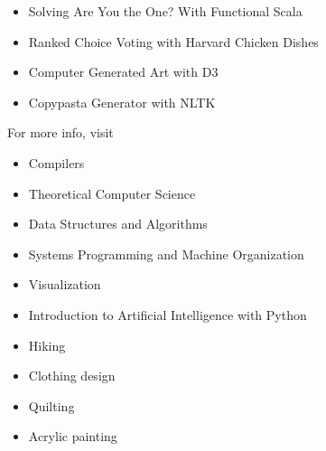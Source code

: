 







\medskip
{}

\medskip
{}
\begin{itemize}
\item Solving Are You the One? With Functional Scala
\item Ranked Choice Voting with Harvard Chicken Dishes
\item Computer Generated Art with D3
\item Copypasta Generator with NLTK
\end{itemize}
For more info, visit 

\medskip
{}
\begin{itemize}
\item Compilers
\item Theoretical Computer Science
\item Data Structures and Algorithms
\item Systems Programming and Machine Organization
\item Visualization
\item Introduction to Artificial Intelligence with Python
\end{itemize}

\medskip
{}
\begin{itemize}
\item Hiking
\item Clothing design
\item Quilting
\item Acrylic painting
\end{itemize}

